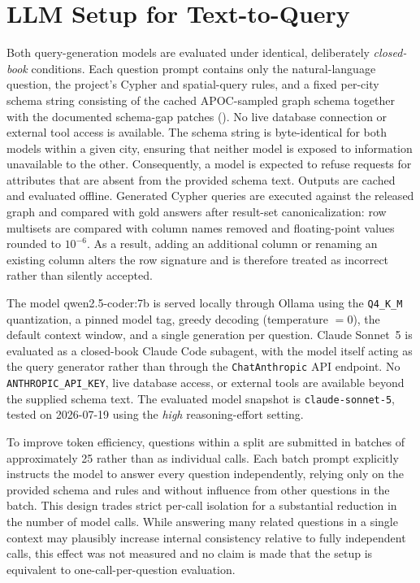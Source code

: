 \documentclass[sigconf,authordraft]{acmart}
\begin{document}
\section{LLM Setup for Text-to-Query}\label{app:full_results_a}

Both query-generation models are evaluated under identical, deliberately \emph{closed-book} conditions. Each question prompt contains only the natural-language question, the project's Cypher and spatial-query rules, and a fixed per-city schema string consisting of the cached APOC-sampled graph schema together with the documented schema-gap patches (). No live database connection or external tool access is available. The schema string is byte-identical for both models within a given city, ensuring that neither model is exposed to information unavailable to the other. Consequently, a model is expected to refuse requests for attributes that are absent from the provided schema text. Outputs are cached and evaluated offline. Generated Cypher queries are executed against the released graph and compared with gold answers after result-set canonicalization: row multisets are compared with column names removed and floating-point values rounded to $10^{-6}$. As a result, adding an additional column or renaming an existing column alters the row signature and is therefore treated as incorrect rather than silently accepted. 

The model qwen2.5-coder:7b is served locally through Ollama using the \texttt{Q4\_K\_M} quantization, a pinned model tag, greedy decoding (temperature $=0$), the default context window, and a single generation per question. Claude Sonnet~5 is evaluated as a closed-book Claude Code subagent, with the model itself acting as the query generator rather than through the \texttt{ChatAnthropic} API endpoint. No \texttt{ANTHROPIC\_API\_KEY}, live database access, or external tools are available beyond the supplied schema text. The evaluated model snapshot is \texttt{claude-sonnet-5}, tested on 2026-07-19 using the \emph{high} reasoning-effort setting. 

To improve token efficiency, questions within a split are submitted in batches of approximately 25 rather than as individual calls. Each batch prompt explicitly instructs the model to answer every question independently, relying only on the provided schema and rules and without influence from other questions in the batch. This design trades strict per-call isolation for a substantial reduction in the number of model calls. While answering many related questions in a single context may plausibly increase internal consistency relative to fully independent calls, this effect was not measured and no claim is made that the setup is equivalent to one-call-per-question evaluation. 
\end{document}
